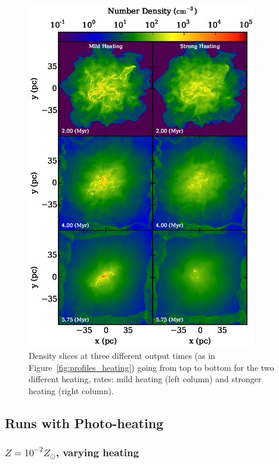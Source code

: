 \documentclass[useAMS,usenatbib]{mn2e}
\begin{document}
\begin{figure}
\begin{center}
\includegraphics[width=10cm]{Images/density_heating_panel}
\end{center}
\caption{\label{fig:density_heating}
Density slices at three different output times (as in Figure~\ref{fig:profiles_heating}) going
from top to bottom for the two different heating, rates: mild heating (left column) and
stronger heating (right column).
}
\end{figure}


\subsection{Runs with Photo-heating}

\subsubsection{$Z=10^{-2}Z_\odot$, varying heating}
\end{document}
